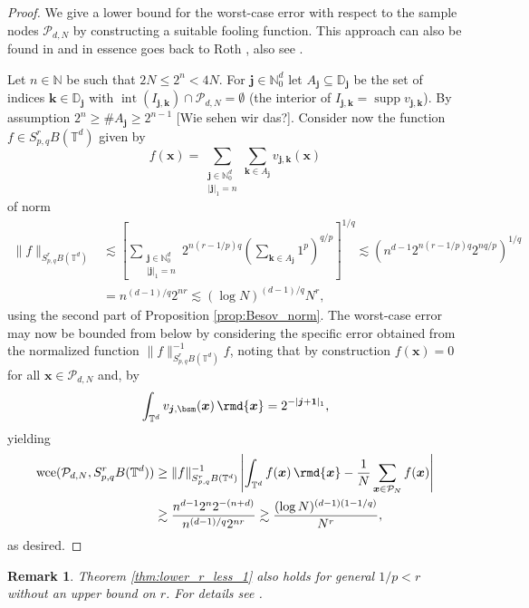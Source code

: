 \documentclass[12pt, a4paper]{article}
\newtheorem{rem}[thm]{Remark}
\newcommand{\wce}{{\rm wce}}
\newcommand{\peter}[1]{\begingroup\color{violet}#1\endgroup}
\newcommand{\bsx}{{\boldsymbol{x}}}
\newcommand{\bsj}{{\boldsymbol{j}}}
\newcommand{\bsk}{{\boldsymbol{k}}}
\newcommand{\calP}{{\mathcal{P}}}
\newcommand{\bbT}{{\mathbb{T}}}
\newcommand{\bbN}{{\mathbb{N}}}
\newcommand{\bbD}{{\mathbb{D}}}
\begin{document}
\begin{proof}
    We give a lower bound for the worst-case error with respect to the sample nodes $\calP_{d, N}$ by constructing a suitable fooling function. This approach can also be found in \cite{DHMP} and in essence goes back to Roth \cite{Roth}, also see \cite{HMOU}.

Let $n \in \bbN$ be such that $2N \leq 2^n < 4N$. For $\bsj \in \bbN_0^d$ let $A_\bsj \subseteq \bbD_\bsj$ be the set of indices $\bsk \in \bbD_\bsj$ with $\operatorname{int} (I_{\bsj, \bsk}) \cap \calP_{d, N} = \emptyset$ (the interior of $I_{\bsj, \bsk} = \operatorname{supp} v_{\bsj, \bsk}$). By assumption $2^n \geq \# A_\bsj \geq 2^{n-1}$ \peter{[Wie sehen wir das?]}. Consider now the function $f \in S^r_{p, q}B(\bbT^d)$ given by
$$
f(\bsx) = \sum_{\substack{\bsj \in \bbN_0^d \\ |\bsj|_1 = n}} \sum_{\bsk \in A_\bsj} v_{\bsj, \bsk}(\bsx)
$$
of norm
\begin{align*}
    \|f\|_{S^r_{p, q}B(\bbT^d)} & \lesssim \left[\sum_{\substack{\bsj \in \bbN_0^d \\ |\bsj|_1 = n}} 2^{n (r-1/p) q} \left(\sum_{\bsk \in A_\bsj} 1^p\right)^{q/p}\right]^{1/q} \lesssim \left(n^{d-1} 2^{n (r-1/p) q} 2^{nq/p}\right)^{1/q} \\
    & = n^{(d-1)/q} 2^{nr} \lesssim (\log N)^{(d-1)/q} N^r,
\end{align*}
using the second part of Proposition \ref{prop:Besov_norm}. The worst-case error may now be bounded from below by considering the specific error obtained from the normalized function $\|f\|_{S^r_{p, q}B(\bbT^d)}^{-1} f$, noting that by construction $f(\bsx) = 0$ for all $\bsx \in \calP_{d, N}$ and, by \cite[Lemma~5.1]{HMOU}
$$
\int_{\bbT^d} v_{\bsj, \bsm}(\bsx) \, \rmd\bsx = 2^{-|\bsj+\mathbf 1|_1},
$$
yielding
\begin{align*}
    \wce(\calP_{d, N}, S^r_{p, q}B(\bbT^d)) & \geq \|f\|_{S^r_{p, q}B(\bbT^d)}^{-1} \left|\int_{\bbT^d} f(\bsx) \, \rmd\bsx - \frac1N \sum_{\bsx \in \calP_N} f(\bsx)\right| \\
    & \gtrsim \frac{n^{d-1} 2^n 2^{-(n+d)}}{n^{(d-1)/q} 2^{nr}} \gtrsim \frac{(\log N)^{(d-1)(1-1/q)}}{N^r},
\end{align*}
as desired.
\end{proof}

\begin{rem}
    Theorem \ref{thm:lower_r_less_1} also holds for general $1/p < r$ without an upper \peter{bound} on $r$. For details see \cite{DU15, HMOU}.
\end{rem}
\end{document}
